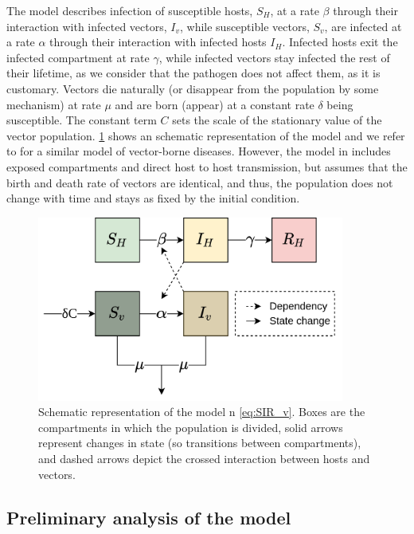 The model describes infection of susceptible hosts, $S_H$, at a rate
$\beta$ through their interaction with infected vectors, $I_v$, while
susceptible vectors, $S_v$, are infected at a rate $\alpha$ through their
interaction with infected hosts $I_H$. Infected hosts exit the infected
compartment at rate $\gamma$, while infected vectors stay infected the rest of
their lifetime, as we consider that the pathogen does not affect them, as it is
customary. Vectors die naturally (or disappear from the population by some
mechanism) at rate $\mu$ and are born (appear) at a constant rate $\delta$
being susceptible. The constant term $C$ sets the scale of the stationary value
of the vector population. \cref{fig:model_diagram} shows an schematic
representation of the model and we refer to \cite{Brauer2016} for a similar
model of vector-borne diseases. However, the model in \cite{Brauer2016}
includes exposed compartments and direct host to host transmission, but assumes
that the birth and death rate of vectors are identical, and thus, the
population does not change with time and stays as fixed by the initial
condition.
\begin{figure}[H]
    \centering
    \includegraphics[width=0.9\textwidth]{Figures/Diagram.png}
    \caption[Diagram of the model]{Schematic representation of the model n
        \cref{eq:SIR_v}. Boxes
        are the compartments in which the population is divided, solid arrows
        represent
        changes in state (so transitions between compartments), and dashed
        arrows
        depict the crossed interaction between hosts and vectors.}
    \label{fig:model_diagram}
\end{figure}

\subsection{Preliminary analysis of the model} \label{sec:Prelimanalysis}

